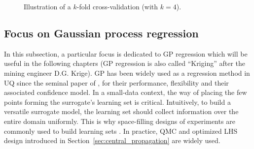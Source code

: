 
\begin{figure}[ht]
    \centering
      \caption{Illustration of a $k$-fold cross-validation (with $k=4$).} 
      \label{fig:kfold}
\end{figure}



\subsection{Focus on Gaussian process regression}

In this subsection, a particular focus is dedicated to GP regression which will be useful in the following chapters (GP regression is also called ``Kriging'' after the mining engineer D.G. Krige). 
GP has been widely used as a regression method in UQ since the seminal paper of \citep{sacks_1989}, for their performance, flexibility and their associated confidence model. 
In a small-data context, the way of placing the few points forming the surrogate's learning set is critical. 
Intuitively, to build a versatile surrogate model, the learning set should collect information over the entire domain uniformly. 
This is why space-filling designs of experiments are commonly used to build learning sets \citep{fang_li_2006}. 
In practice, QMC and optimized LHS design introduced in Section~\ref{sec:central_propagation} are widely used.  


